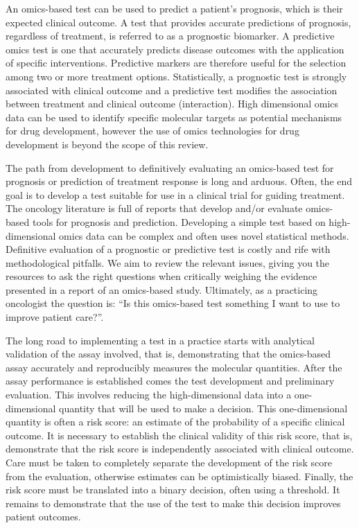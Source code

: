 \documentclass[11pt]{article}
\begin{document}
An omics-based test can be used to predict a patient's prognosis, which
is their expected clinical outcome. A test that provides accurate
predictions of prognosis, regardless of treatment, is referred to as a
prognostic biomarker. A predictive omics test is one that accurately
predicts disease outcomes with the application of specific
interventions. Predictive markers are therefore useful for the selection
among two or more treatment options. Statistically, a prognostic test is
strongly associated with clinical outcome and a predictive test modifies
the association between treatment and clinical outcome (interaction).
High dimensional omics data can be used to identify specific molecular
targets as potential mechanisms for drug development, however the use of
omics technologies for drug development is beyond the scope of this
review.

The path from development to definitively evaluating an omics-based test
for prognosis or prediction of treatment response is long and arduous.
Often, the end goal is to develop a test suitable for use in a clinical
trial for guiding treatment. The oncology literature is full of reports
that develop and/or evaluate omics-based tools for prognosis and
prediction. Developing a simple test based on high-dimensional omics
data can be complex and often uses novel statistical methods. Definitive
evaluation of a prognostic or predictive test is costly and rife with
methodological pitfalls. We aim to review the relevant issues, giving
you the resources to ask the right questions when critically weighing
the evidence presented in a report of an omics-based study. Ultimately,
as a practicing oncologist the question is: ``Is this omics-based test
something I want to use to improve patient care?''.

The long road to implementing a test in a practice starts with
analytical validation of the assay involved, that is, demonstrating that
the omics-based assay accurately and reproducibly measures the molecular
quantities. After the assay performance is established comes the test
development and preliminary evaluation. This involves reducing the
high-dimensional data into a one-dimensional quantity that will be used
to make a decision. This one-dimensional quantity is often a risk score:
an estimate of the probability of a specific clinical outcome. It is
necessary to establish the clinical validity of this risk score, that
is, demonstrate that the risk score is independently associated with
clinical outcome. Care must be taken to completely separate the
development of the risk score from the evaluation, otherwise estimates
can be optimistically biased. Finally, the risk score must be translated
into a binary decision, often using a threshold. It remains to
demonstrate that the use of the test to make this decision improves
patient outcomes.
\end{document}
